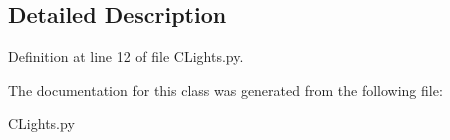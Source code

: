 \subsection{Detailed Description}


Definition at line 12 of file C\+Lights.\+py.



The documentation for this class was generated from the following file\+:\begin{DoxyCompactItemize}
\item 
C\+Lights.\+py\end{DoxyCompactItemize}
